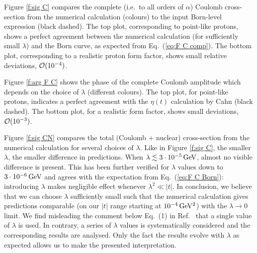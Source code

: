 \documentclass{appolb}
\def\un#1{\,{\rm #1}}
\def\NEW#1{{#1}}
\begin{document}
Figure \ref{f:sig C} compares the complete (i.e.~to all orders of $\alpha$) Coulomb cross-section from the numerical calculation (colours) to the input Born-level expression (black dashed). The top plot, corresponding to point-like protons, shows a perfect agreement between the numerical calculation (for sufficiently small $\lambda$) and the Born curve, as expected from Eq.~(\ref{eq:F C comp}). The bottom plot, corresponding to a realistic proton form factor, shows small relative deviations, ${\cal O}(10^{-4})$.

Figure \ref{f:arg F C} shows the phase of the complete Coulomb amplitude which depends on the choice of $\lambda$ (different colours). The top plot, for point-like protons, indicates a perfect agreement with the $\eta(t)$ calculation by Cahn (black dashed). The bottom plot, for a realistic form factor, shows small deviations, ${\cal O}(10^{-3})$.

Figure \ref{f:sig CN} compares the total (Coulomb + nuclear) cross-section from the numerical calculation for several choices of $\lambda$. Like in Figure \ref{f:sig C}, the smaller $\lambda$, the smaller difference in predictions. When $\lambda \lesssim 3\cdot 10^{-5}\un{GeV}$, almost no visible difference is present. This has been further verified for $\lambda$ values down to $3\cdot10^{-6}\un{GeV}$ and agrees with the expectation from Eq.~(\ref{eq:F C Born}): introducing $\lambda$ makes negligible effect whenever $\lambda^2 \ll |t|$. In conclusion, we believe that we can choose $\lambda$ sufficiently small such that the numerical calculation gives predictions comparable (on our $|t|$ range starting at $10^{-4}\un{GeV^2}$) with the $\lambda\to 0$ limit. \NEW{We find misleading the comment below Eq.~(1) in Ref.~\cite{petrov2020-2} that a single value of $\lambda$ is used. In contrary, a series of $\lambda$ values is systematically considered and the corresponding results are analysed. Only the fact the results evolve with $\lambda$ as expected allows us to make the presented interpretation.}
\end{document}
